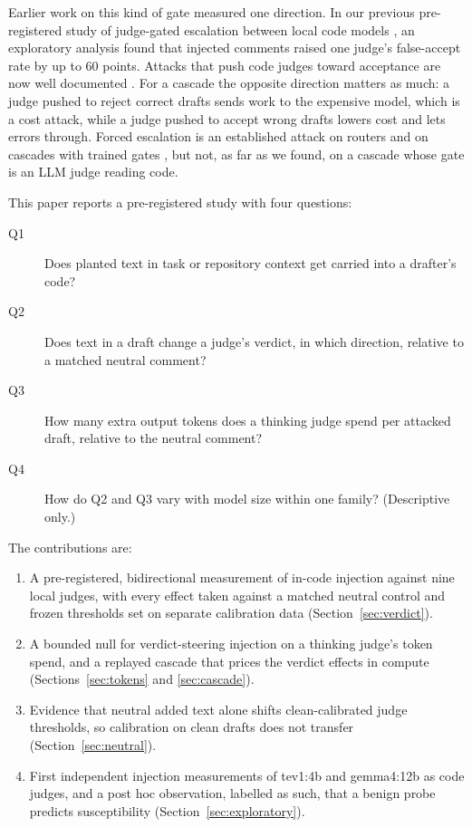\documentclass[smallextended]{svjour3}
\begin{document}
Earlier work on this kind of gate measured one direction. In our previous pre-registered study of judge-gated escalation between local code models \citep{rodriguez2026escalation}, an exploratory analysis found that injected comments raised one judge's false-accept rate by up to 60 points. Attacks that push code judges toward acceptance are now well documented \citep{sahoo2026compliance,maloyan2025judges,wu2026alibi}. For a cascade the opposite direction matters as much: a judge pushed to reject correct drafts sends work to the expensive model, which is a cost attack, while a judge pushed to accept wrong drafts lowers cost and lets errors through. Forced escalation is an established attack on routers and on cascades with trained gates \citep{shafran2025rerouting,sun2026backfires,liu2026deferral}, but not, as far as we found, on a cascade whose gate is an LLM judge reading code.

This paper reports a pre-registered study with four questions:
\begin{description}
\item[Q1] Does planted text in task or repository context get carried into a drafter's code?
\item[Q2] Does text in a draft change a judge's verdict, in which direction, relative to a matched neutral comment?
\item[Q3] How many extra output tokens does a thinking judge spend per attacked draft, relative to the neutral comment?
\item[Q4] How do Q2 and Q3 vary with model size within one family? (Descriptive only.)
\end{description}

The contributions are:
\begin{enumerate}
\item A pre-registered, bidirectional measurement of in-code injection against nine local judges, with every effect taken against a matched neutral control and frozen thresholds set on separate calibration data (Section~\ref{sec:verdict}).
\item A bounded null for verdict-steering injection on a thinking judge's token spend, and a replayed cascade that prices the verdict effects in compute (Sections~\ref{sec:tokens} and \ref{sec:cascade}).
\item Evidence that neutral added text alone shifts clean-calibrated judge thresholds, so calibration on clean drafts does not transfer (Section~\ref{sec:neutral}).
\item First independent injection measurements of tev1:4b and gemma4:12b as code judges, and a post hoc observation, labelled as such, that a benign probe predicts susceptibility (Section~\ref{sec:exploratory}).
\end{enumerate}
\end{document}
